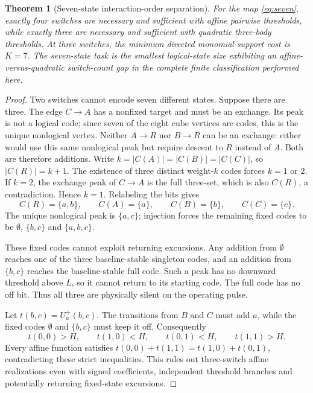 \documentclass[12pt,letterpaper]{article}
\newtheorem{theorem}{Theorem}[section]
\theoremstyle{definition}\newtheorem{definition}[theorem]{Definition}
\theoremstyle{remark}\newtheorem{remark}[theorem]{Remark}
\begin{document}
\begin{theorem}[Seven-state interaction-order separation]\label{thm:seven}
For the map \eqref{eq:seven}, exactly four switches are necessary and sufficient with affine pairwise thresholds, while exactly three are necessary and sufficient with quadratic three-body thresholds. At three switches, the minimum directed monomial-support cost is $K=7$. The seven-state task is the smallest logical-state size exhibiting an affine-versus-quadratic switch-count gap in the complete finite classification performed here.
\end{theorem}
\begin{proof}
Two switches cannot encode seven different states. Suppose there are three. The edge $C\to A$ has a nonfixed target and must be an exchange. Its peak is not a logical code; since seven of the eight cube vertices are codes, this is the unique nonlogical vertex. Neither $A\to R$ nor $B\to R$ can be an exchange: either would use this same nonlogical peak but require descent to $R$ instead of $A$. Both are therefore additions. Write $k=|C(A)|=|C(B)|=|C(C)|$, so $|C(R)|=k+1$. The existence of three distinct weight-$k$ codes forces $k=1$ or $2$. If $k=2$, the exchange peak of $C\to A$ is the full three-set, which is also $C(R)$, a contradiction. Hence $k=1$. Relabeling the bits gives
\[
 C(R)=\{a,b\},\qquad C(A)=\{a\},\qquad C(B)=\{b\},\qquad C(C)=\{c\}.
\]
The unique nonlogical peak is $\{a,c\}$; injection forces the remaining fixed codes to be $\emptyset$, $\{b,c\}$ and $\{a,b,c\}$.

These fixed codes cannot exploit returning excursions. Any addition from $\emptyset$ reaches one of the three baseline-stable singleton codes, and an addition from $\{b,c\}$ reaches the baseline-stable full code. Such a peak has no downward threshold above $L$, so it cannot return to its starting code. The full code has no off bit. Thus all three are physically silent on the operating pulse.

Let $t(b,c)=U_a^+(b,c)$. The transitions from $B$ and $C$ must add $a$, while the fixed codes $\emptyset$ and $\{b,c\}$ must keep it off. Consequently
\begin{equation}\label{eq:xor}
 t(0,0)>H,\qquad t(1,0)<H,\qquad t(0,1)<H,\qquad t(1,1)>H.
\end{equation}
Every affine function satisfies $t(0,0)+t(1,1)=t(1,0)+t(0,1)$, contradicting these strict inequalities. This rules out three-switch affine realizations even with signed coefficients, independent threshold branches and potentially returning fixed-state excursions.


\end{proof}
\end{document}
